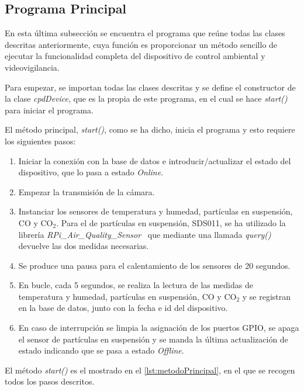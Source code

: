 \subsection{Programa Principal}\label{subsec:programa-principal}
En esta última subsección se encuentra el programa que reúne todas las clases descritas anteriormente, cuya función es proporcionar un método sencillo de ejecutar la funcionalidad completa del dispositivo de control ambiental y videovigilancia.

Para empezar, se importan todas las clases descritas y se define el constructor de la clase \textit{cpdDevice}, que es la propia de este programa, en el cual se hace \textit{start()} para iniciar el programa.

El método principal, \textit{start()}, como se ha dicho, inicia el programa y esto requiere los siguientes pasos:
\begin{enumerate}
	\item Iniciar la conexión con la base de datos e introducir/actualizar el estado del dispositivo, que lo pasa a estado \textit{Online}.
	\item Empezar la transmisión de la cámara.
	\item Instanciar los sensores de temperatura y humedad, partículas en suspensión, CO y CO$_2$. Para el de partículas en suspensión, SDS011, se ha utilizado la librería \textit{RPi\_Air\_Quality\_Sensor}~\cite{rovai_python4ds_2021} que mediante una llamada \textit{query()} devuelve las dos medidas necesarias.
	\item Se produce una pausa para el calentamiento de los sensores de 20 segundos.
	\item En bucle, cada 5 segundos, se realiza la lectura de las medidas de temperatura y humedad, partículas en suspensión, CO y CO$_2$ y se registran en la base de datos, junto con la fecha e id del dispositivo.
	\item En caso de interrupción se limpia la asignación de los puertos GPIO, se apaga el sensor de partículas en suspensión y se manda la última actualización de estado indicando que se pasa a estado \textit{Offline}.
\end{enumerate}

El método \textit{start()} es el mostrado en el \autoref{lst:metodoPrincipal}, en el que se recogen todos los pasos descritos.
\pagebreak

